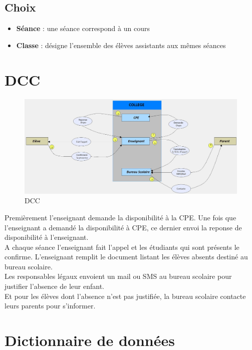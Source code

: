 \documentclass[12pt,french,titlepage]{article}
\begin{document}
	  \subsection{Choix}
	  
	  \begin{itemize}
	      \item \textbf{Séance} : une séance correspond à un cours
	      \item \textbf{Classe} : désigne l'ensemble des élèves assistants aux mêmes séances 
	  \end{itemize}
	  
	  \section{DCC}
	  
	  \begin{figure}[H]
	      \centering
	      \includegraphics[scale=0.35]{./DCC.jpg}
	      \caption{DCC}
	  \end{figure}
	  
	  Premièrement l'enseignant demande la disponibilité à la CPE. Une fois que l'enseignant a demandé la disponibilité à CPE, ce dernier envoi la reponse de disponibilité à l'enseignant.\\
	  A chaque séance l'enseignant fait l'appel et les étudiants qui sont présents le confirme. L'enseignant remplit
	  le document listant les élèves absents destiné au bureau scolaire.\\
	  Les responsables légaux envoient un mail ou SMS au bureau scolaire pour justifier l'absence de leur enfant.\\
	  Et pour les élèves dont l'absence n'est pas justifiée, la bureau scolaire contacte leurs parents pour s'informer.\\
	  \section{Dictionnaire de données}
	  
\end{document}
